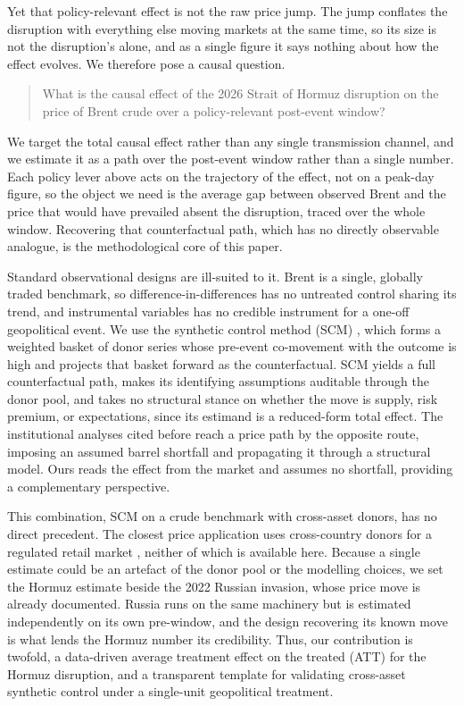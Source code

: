 Yet that policy-relevant effect is not the raw price jump. The jump conflates the disruption
with everything else moving markets at the same time, so its size is not the disruption's
alone, and as a single figure it says nothing about how the effect evolves. We therefore
pose a causal question.

\begin{quote}
What is the causal effect of the 2026 Strait of Hormuz disruption on the price of Brent
crude over a policy-relevant post-event window?
\end{quote}

We target the total causal effect rather than any single transmission channel, and we
estimate it as a path over the post-event window rather than a single number. Each policy
lever above acts on the trajectory of the effect, not on a peak-day figure, so the object
we need is the average gap between observed Brent and the price that would have prevailed
absent the disruption, traced over the whole window. Recovering that counterfactual path,
which has no directly observable analogue, is the methodological core of this paper.

Standard observational designs are ill-suited to it. Brent is a single, globally traded
benchmark, so difference-in-differences has no untreated control sharing its trend, and
instrumental variables has no credible instrument for a one-off geopolitical event. We use the synthetic control method (SCM) \citep{abadie2010,abadie2021}, which
forms a weighted basket of donor series whose pre-event co-movement with the outcome is
high and projects that basket forward as the counterfactual. SCM yields a full
counterfactual path, makes its identifying assumptions auditable through the donor pool,
and takes no structural stance on whether the move is supply, risk premium, or
expectations, since its estimand is a reduced-form total effect. The institutional analyses
cited before reach a price path by the opposite route, imposing an assumed barrel shortfall and
propagating it through a structural model. Ours reads the effect from the market and assumes no shortfall,
providing a complementary perspective.

This combination, SCM on a crude benchmark with cross-asset donors, has no direct
precedent. The closest price application uses cross-country donors for a regulated retail
market \citep{becker2021}, neither of which is available here. Because a single estimate
could be an artefact of the donor pool or the modelling choices, we set the Hormuz estimate
beside the 2022 Russian invasion, whose price move is already documented. Russia runs on the
same machinery but is estimated independently on its own pre-window, and the design
recovering its known move is what lends the Hormuz number its credibility. Thus, our contribution is twofold, a
data-driven average treatment effect on the treated (ATT) for the Hormuz disruption, and a
transparent template for validating cross-asset synthetic control under a single-unit
geopolitical treatment.

